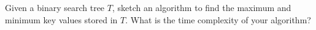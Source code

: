 Given a binary search tree $T$, sketch an algorithm to find the maximum
and minimum key values stored in $T$. What is the time complexity of
your algorithm?
